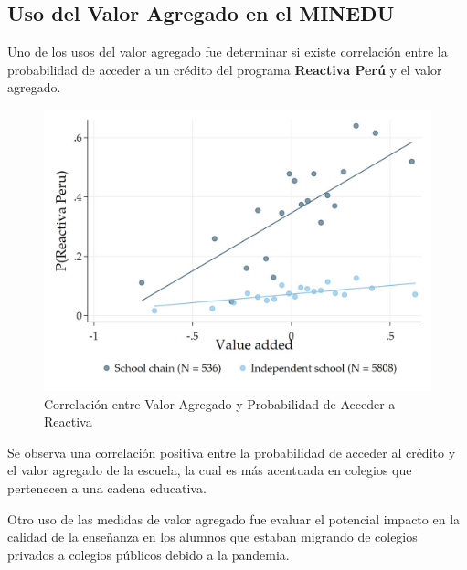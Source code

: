 \documentclass[11pt]{article}
\numberwithin{equation}{section}
\begin{document}
\newpage
\subsection*{\bf Uso del Valor Agregado en el MINEDU} 

Uno de los usos del valor agregado fue determinar si existe correlaci\'on entre la probabilidad de acceder a un cr\'edito del programa {\bf Reactiva Per\'u} y el valor agregado.


\begin{figure}[!htb]
    \begin{minipage}[b]{0.99\textwidth}
        \begin{center}
            \caption{Correlaci\'on entre Valor Agregado y Probabilidad de Acceder a Reactiva}
            \includegraphics[scale=0.29]{figures/ReactivaVA.jpeg}
            
        \end{center}

    \end{minipage}
\end{figure}
Se observa una correlaci\'on positiva entre la probabilidad de acceder al cr\'edito y el valor agregado de la escuela, la cual es m\'as acentuada en colegios que pertenecen a una cadena educativa. 

Otro uso de las medidas de valor agregado fue evaluar el potencial impacto en la calidad de la ense\~{n}anza en los alumnos que estaban migrando de colegios privados a colegios p\'ublicos debido a la pandemia.
\end{document}
